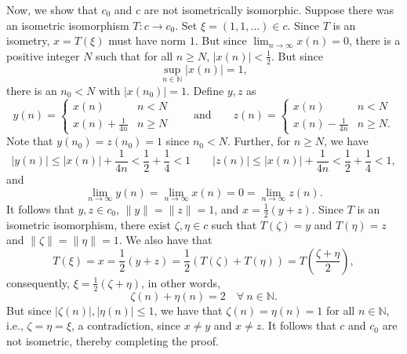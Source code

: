 \documentclass[10pt]{amsart}
\theoremstyle{thmstyle}
\theoremstyle{defstyle}
\newcommand{\N}{\mathbb{N}}
\renewcommand{\le}{\leqslant}
\renewcommand{\ge}{\geqslant}
\begin{document}
Now, we show that $c_0$ and $c$ are not isometrically isomorphic. Suppose there was an isometric isomorphism $T: c\to c_0$. Set $\xi = (1,1,\dots)\in c$. Since $T$ is an isometry, $x = T(\xi)$ must have norm $1$. But since $\lim_{n\to\infty} x(n) = 0$, there is a positive integer $N$ such that for all $n\ge N$, $|x(n)| < \frac{1}{2}$. But since 
\begin{equation*}
	\sup_{n\in\N} |x(n)| = 1,
\end{equation*}
there is an $n_0 < N$ with $|x(n_0)| = 1$. Define $y, z$ as 
\begin{equation*}
	y(n) = 
	\begin{cases}
		x(n) & n < N\\
		x(n) + \frac{1}{4n} & n\ge N
	\end{cases}
	\qquad\text{and}\qquad
	z(n) = 
	\begin{cases}
		x(n) & n < N\\ 
		x(n) - \frac{1}{4n} & n\ge N.
	\end{cases}
\end{equation*}
Note that $y(n_0) = z(n_0) = 1$ since $n_0 < N$. Further, for $n\ge N$, we have 
\begin{equation*}
	|y(n)|\le |x(n)| + \frac{1}{4n} < \frac{1}{2} + \frac{1}{4} < 1\qquad |z(n)|\le |x(n)| + \frac{1}{4n} < \frac{1}{2} + \frac{1}{4} < 1,
\end{equation*}
and 
\begin{equation*}
	\lim_{n\to\infty} y(n) = \lim_{n\to\infty}x(n) = 0 = \lim_{n\to\infty} z(n).
\end{equation*}
It follows that $y, z\in c_0$, $\|y\| = \|z\| = 1$, and $x = \frac{1}{2}\left(y + z\right)$. Since $T$ is an isometric isomorphism, there exist $\zeta,\eta\in c$ such that $T(\zeta) = y$ and $T(\eta) = z$ and $\|\zeta\| = \|\eta\| = 1$. We also have that 
\begin{equation*}
	T(\xi) = x = \frac{1}{2}\left(y + z\right) = \frac{1}{2}\left(T(\zeta)  + T(\eta)\right) = T\left(\frac{\zeta + \eta}{2}\right),
\end{equation*}
consequently, $\xi = \frac{1}{2}\left(\zeta + \eta\right)$, in other words, 
\begin{equation*}
	\zeta(n) + \eta(n) = 2\quad\forall~n\in\N.
\end{equation*}
But since $|\zeta(n)|,|\eta(n)|\le 1$, we have that $\zeta(n) = \eta(n) = 1$ for all $n\in\N$, i.e., $\zeta = \eta = \xi$, a contradiction, since $x\ne y$ and $x\ne z$. It follows that $c$ and $c_0$ are not isometric, thereby completing the proof.
\end{document}
